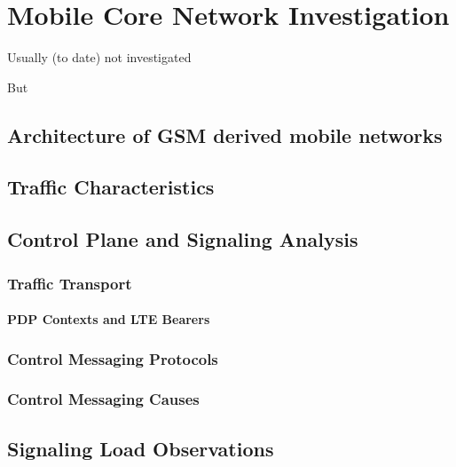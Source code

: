 \chapter{Mobile Core Network Investigation}

Usually (to date) not investigated

But 



\section{Architecture of GSM derived mobile networks}





\section{Traffic Characteristics}



\section{Control Plane and Signaling Analysis}
\subsection{Traffic Transport}
\subsubsection{PDP Contexts and LTE Bearers}
\subsection{Control Messaging Protocols}
\subsection{Control Messaging Causes}



\section{Signaling Load Observations}




